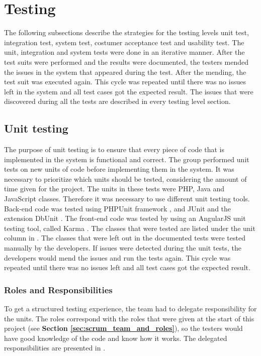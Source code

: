 \chapter{Testing}
\label{chap:testing}

The following subsections describe the strategies for the testing levels unit test, integration test, system test, costumer acceptance test and usability test. 
The unit, integration and system tests were done in an iterative manner. After the test suits were performed and the results were documented, the testers mended the issues in the system that appeared during the test. After the mending, the test suit was executed again. This cycle was repeated until there was no issues left in the system and all test cases got the expected result. The issues that were discovered during all the tests are described in every testing level section. 


\section{Unit testing}
\label{sec:unit_testing}
The purpose of unit testing is to ensure that every piece of code that is implemented in the system is functional and correct. The group performed unit tests on new units of code before implementing them in the system. It was necessary to prioritize which units should be tested, considering the amount of time given for the project. 
The units in these tests were PHP, Java and JavaScript classes. Therefore it was necessary to use different unit testing tools. Back-end code was tested using PHPUnit framework \cite{KF2}, and JUnit \cite{jUnit} and the extension DbUnit \cite{dbUnit}. The front-end code was tested by using an AngularJS unit testing tool, called Karma \cite{KF3}. 
The classes that were tested are listed under the unit column in \textbf{}. The classes that were left out in the documented tests were tested manually by the developers. If issues were detected during the unit tests, the developers would mend the issues and run the tests again. This cycle was repeated until there was no issues left and all test cases got the expected result.

\subsection{Roles and Responsibilities}
To get a structured testing experience, the team had to delegate responsibility for the units. The roles correspond with the roles that were given at the start of this project (see \textbf{Section \ref{sec:scrum_team_and_roles}}), so the testers would have good knowledge of the code and know how it works. The delegated responsibilities are presented in \textbf{}.



